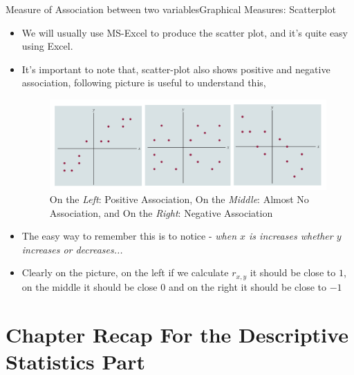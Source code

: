\documentclass[8pt, usepdftitle=false]{beamer}
\begin{document}
\begin{frame}[allowframebreaks]{Measure of Association between two variables}{Graphical Measures: Scatterplot}
\begin{itemize}
\item We will usually use MS-Excel to produce the scatter plot, and it's quite easy using Excel. 



\framebreak

\item It's important to note that, scatter-plot also shows positive and negative association, following picture is useful to understand this,

\begin{figure}[H]
\centering
\includegraphics[scale = .30]{Images/scatterplots.png}
\caption{On the \emph{Left}: \alert{Positive Association}, On the \emph{Middle}: Almost \alert{No Association}, and On the \emph{Right}: \alert{Negative Association}}
\end{figure}

\item The easy way to remember this is to notice - \emph{when $x$ is increases whether $y$ increases or decreases...}


\item Clearly on the picture, on the left if we calculate $r_{x, y}$ it should be close to $1$, on the middle it should be close $0$ and on the right it should be close to $-1$


\end{itemize}


\end{frame}


\section{Chapter Recap For the Descriptive Statistics Part}
\frame{\sectionpage}
\end{document}
